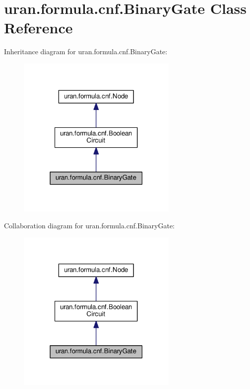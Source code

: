 \hypertarget{classuran_1_1formula_1_1cnf_1_1_binary_gate}{}\section{uran.\+formula.\+cnf.\+Binary\+Gate Class Reference}
\label{classuran_1_1formula_1_1cnf_1_1_binary_gate}


Inheritance diagram for uran.\+formula.\+cnf.\+Binary\+Gate\+:
\nopagebreak
\begin{figure}[H]
\begin{center}
\leavevmode
\includegraphics[width=219pt]{classuran_1_1formula_1_1cnf_1_1_binary_gate__inherit__graph}
\end{center}
\end{figure}


Collaboration diagram for uran.\+formula.\+cnf.\+Binary\+Gate\+:
\nopagebreak
\begin{figure}[H]
\begin{center}
\leavevmode
\includegraphics[width=219pt]{classuran_1_1formula_1_1cnf_1_1_binary_gate__coll__graph}
\end{center}
\end{figure}
